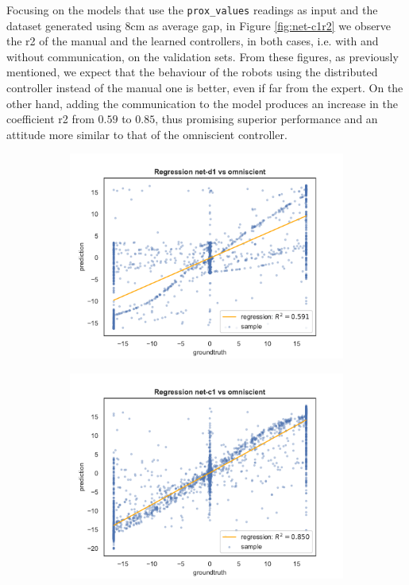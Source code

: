 Focusing on the models that use the \texttt{prox\_values} readings as input and 
the dataset generated using $8$\gls{cm} as average gap, in Figure 
\ref{fig:net-c1r2} we observe the \gls{r2} of the manual and the learned 
controllers, in both cases, i.e. with and without communication, on the validation 
sets.
From these figures, as previously mentioned, we expect that the behaviour of the 
robots using the distributed controller instead of the manual one is better, even if 
far from the expert. On the other hand, adding the communication to the model 
produces an increase in the coefficient \gls{r2} from $0.59$ to $0.85$, thus 
promising superior performance and an attitude more similar to that of the 
omniscient controller.

\begin{figure}[!htb]
	\begin{center}
		\begin{subfigure}[h]{0.49\textwidth}
			\includegraphics[width=\textwidth]{contents/images/net-d1/regression-net-d1-vs-omniscient}%
		\end{subfigure}
		\hfill\vspace{-0.5cm}
		\begin{subfigure}[h]{0.49\textwidth}
			\includegraphics[width=\textwidth]{contents/images/net-c1/regression-net-c1-vs-omniscient}%

\end{subfigure}
\end{center}
\end{figure}
